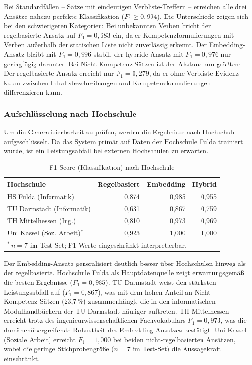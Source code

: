 Bei Standardfällen -- Sätze mit eindeutigen Verbliste-Treffern -- erreichen alle drei Ansätze nahezu perfekte Klassifikation ($F_1 \geq 0{,}994$).
Die Unterschiede zeigen sich bei den schwierigeren Kategorien: Bei unbekannten Verben bricht der regelbasierte Ansatz auf $F_1 = 0{,}683$ ein, da er Kompetenzformulierungen mit Verben außerhalb der statischen Liste nicht zuverlässig erkennt.
Der Embedding-Ansatz bleibt mit $F_1 = 0{,}996$ stabil, der hybride Ansatz mit $F_1 = 0{,}976$ nur geringfügig darunter.
Bei Nicht-Kompetenz-Sätzen ist der Abstand am größten: Der regelbasierte Ansatz erreicht nur $F_1 = 0{,}279$, da er ohne Verbliste-Evidenz kaum zwischen Inhaltsbeschreibungen und Kompetenzformulierungen differenzieren kann.

\subsubsection{Aufschlüsselung nach Hochschule}\label{sec:eval-hochschule}

Um die Generalisierbarkeit zu prüfen, werden die Ergebnisse nach Hochschule aufgeschlüsselt.
Da das System primär auf Daten der Hochschule Fulda trainiert wurde, ist ein Leistungsabfall bei externen Hochschulen zu erwarten.

\begin{table}[H]
\caption{F1-Score (Klassifikation) nach Hochschule\label{tab:eval-hochschule}}
\centering
\begin{tabular}{lrrr}
\hline
\textbf{Hochschule} & \textbf{Regelbasiert} & \textbf{Embedding} & \textbf{Hybrid} \\
\hline
HS Fulda (Informatik) & 0{,}874 & 0{,}985 & 0{,}955 \\
TU Darmstadt (Informatik) & 0{,}631 & 0{,}867 & 0{,}759 \\
TH Mittelhessen (Ing.) & 0{,}810 & 0{,}973 & 0{,}969 \\
Uni Kassel (Soz. Arbeit)$^*$ & 0{,}923 & 1{,}000 & 1{,}000 \\
\hline
\multicolumn{4}{l}{\scriptsize $^*$\,$n = 7$ im Test-Set; F1-Werte eingeschränkt interpretierbar.} \\
\end{tabular}
\end{table}

Der Embedding-Ansatz generalisiert deutlich besser über Hochschulen hinweg als der regelbasierte.
Hochschule Fulda als Hauptdatenquelle zeigt erwartungsgemäß die besten Ergebnisse ($F_1 = 0{,}985$).
TU Darmstadt weist den stärksten Leistungsabfall auf ($F_1 = 0{,}867$), was mit dem hohen Anteil an Nicht-Kompetenz-Sätzen (23{,}7\,\%) zusammenhängt, die in den informatischen Modulhandbüchern der TU Darmstadt häufiger auftreten.
TH Mittelhessen erreicht trotz des ingenieurwissenschaftlichen Fachvokabulars $F_1 = 0{,}973$, was die domänenübergreifende Robustheit des Embedding-Ansatzes bestätigt.
Uni Kassel (Soziale Arbeit) erreicht $F_1 = 1{,}000$ bei beiden nicht-regelbasierten Ansätzen, wobei die geringe Stichprobengröße ($n = 7$ im Test-Set) die Aussagekraft einschränkt.

